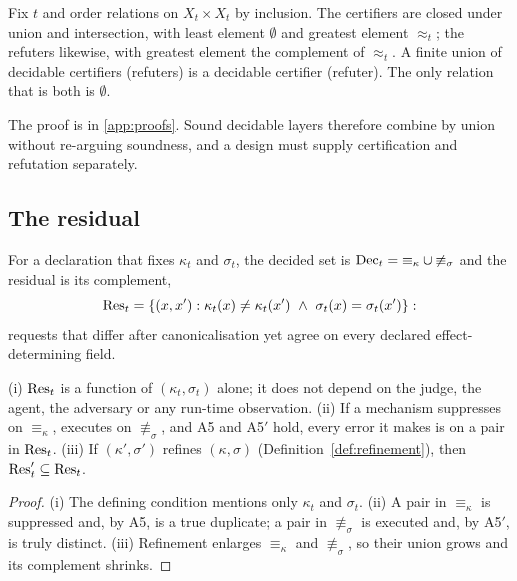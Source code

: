 \begin{proposition}[Structure]\label{prop:lattice}
Fix $t$ and order relations on $X_t\times X_t$ by inclusion. The certifiers are closed under union and intersection, with least element $\emptyset$ and greatest element $\approx_t$; the refuters likewise, with greatest element the complement of $\approx_t$. A finite union of decidable certifiers (refuters) is a decidable certifier (refuter). The only relation that is both is $\emptyset$.
\end{proposition}

The proof is in \ref{app:proofs}. Sound decidable layers therefore combine by union without re-arguing soundness, and a design must supply certification and refutation separately.

\subsection{The residual}

\begin{definition}\label{def:residual}
For a declaration that fixes $\kappa_t$ and $\sigma_t$, the decided set is $\mathrm{Dec}_t={\equiv_\kappa}\cup{\not\equiv_\sigma}$ and the residual is its complement,
\[
\Res_t=\{(x,x') : \kappa_t(x)\ne\kappa_t(x') \ \wedge\ \sigma_t(x)=\sigma_t(x')\}:
\]
requests that differ after canonicalisation yet agree on every declared effect-determining field.
\end{definition}

\begin{proposition}\label{prop:residual}
(i) $\mathrm{Res}_t$ is a function of $(\kappa_t,\sigma_t)$ alone; it does not depend on the judge, the agent, the adversary or any run-time observation. (ii) If a mechanism suppresses on $\equiv_\kappa$, executes on $\not\equiv_\sigma$, and A5 and A5$'$ hold, every error it makes is on a pair in $\mathrm{Res}_t$. (iii) If $(\kappa',\sigma')$ refines $(\kappa,\sigma)$ (Definition~\ref{def:refinement}), then $\mathrm{Res}'_t\subseteq\mathrm{Res}_t$.
\end{proposition}

\begin{proof}
(i) The defining condition mentions only $\kappa_t$ and $\sigma_t$. (ii) A pair in $\equiv_\kappa$ is suppressed and, by A5, is a true duplicate; a pair in $\not\equiv_\sigma$ is executed and, by A5$'$, is truly distinct. (iii) Refinement enlarges $\equiv_\kappa$ and $\not\equiv_\sigma$, so their union grows and its complement shrinks.
\end{proof}


